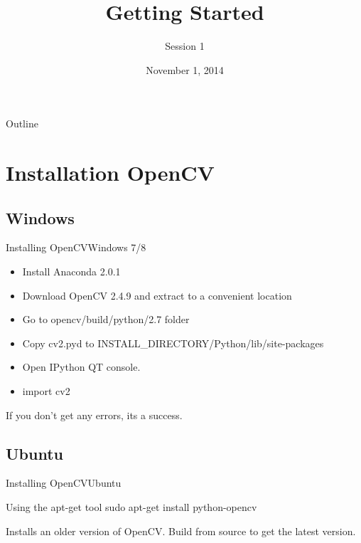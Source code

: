 \documentclass{beamer}
\title{Getting Started}
\subtitle{Session 1}
\institute[Computer Vision Group] %
{
  Computer Vision Group\\
  IIT Madras
}
\date{November 1, 2014}
\begin{document}
\begin{frame}
  \titlepage
\end{frame}

\begin{frame}{Outline}
  \tableofcontents
\end{frame}

\section{Installation OpenCV}

\subsection{Windows}

\begin{frame}{Installing OpenCV}{Windows 7/8}
  \begin{itemize}
  \item {
    Install Anaconda 2.0.1
  }
  \item {
    Download OpenCV 2.4.9 and extract to a convenient location
  }
  \item{
    Go to opencv/build/python/2.7 folder
  }
  \item{
    Copy cv2.pyd to INSTALL\_DIRECTORY/Python/lib/site-packages
  }
  \item{
    Open IPython QT console.
  }
  \item{
    import cv2
  }
  \end{itemize}
  If you don't get any errors, its a success.
\end{frame}

\subsection{Ubuntu}

\begin{frame}{Installing OpenCV}{Ubuntu}
\begin{block}{Using the apt-get tool}
sudo apt-get install python-opencv
\end{block}


Installs an older version of OpenCV. Build from source to get the latest version.
\end{frame}
\end{document}

